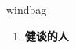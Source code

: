 
\begin{frame}
{\huge windbag}
\begin{center}
\begin{enumerate}\Large
  \item \textbf{健谈的人}
\end{enumerate}
\end{center}
\end{frame}

